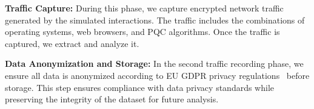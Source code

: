 \documentclass[10pt,journal]{IEEEtran}%
\begin{document}
{\bf Traffic Capture:} During this phase, we capture encrypted network traffic generated by the simulated interactions. The traffic includes the combinations of operating systems, web browsers, and PQC algorithms. Once the traffic is captured, we extract and analyze it.%

{\bf Data Anonymization and Storage:} In the second traffic recording phase, we ensure all data is anonymized according to EU GDPR privacy regulations~\cite{GDPR2016} before storage. This step ensures compliance with data privacy standards while preserving the integrity of the dataset for future analysis.
\end{document}
